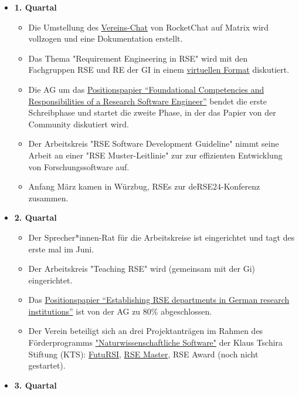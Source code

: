 \begin{itemize}
 \item[] \textbf{1. Quartal}
   \begin{itemize}
     \item Die Umstellung des \href{https://de-rse.org/de/matrix.html}{Vereins-Chat} von RocketChat auf Matrix wird vollzogen und eine Dokumentation erstellt.
     \item Das Thema "Requirement Engineering in RSE" wird mit den Fachgruppen RSE und RE der GI in einem \href{https://fg-re.gi.de/veranstaltung/event-re-and-rse}{virtuellen Format} diskutiert.
     \item Die AG um das \href{https://doi.org/10.12688/f1000research.157778.2}{Positionspapier “Foundational Competencies and Responsibilities of a Research Software Engineer”} bendet die erste Schreibphase und startet die zweite Phase, in der das Papier von der Community diskutiert wird. 
     \item Der Arbeitskreis "RSE Software Development Guideline" nimmt seine Arbeit an einer "RSE Muster-Leitlinie" zur zur effizienten Entwicklung von Forschungssoftware auf.
     \item Anfang März kamen in Würzbug,  RSEs zur deRSE24-Konferenz zusammen.
  
   \end{itemize}\clearpage
 \item[] \textbf{2. Quartal}
   \begin{itemize}
    \item Der Sprecher*innen-Rat für die Arbeitskreise ist eingerichtet und tagt des erste mal im Juni.
    \item Der Arbeitskreis "Teaching RSE" wird (gemeinsam mit der Gi) eingerichtet.
    \item Das \href{https://github.com/DE-RSE/2023_paper-RSE-groups}{Positionspapier “Establishing RSE departments in German research institutions”} ist von der AG zu 80\% abgeschlossen.
    \item Der Verein beteiligt sich an drei Projektanträgen im Rahmen des Förderprogramms \href{https://klaus-tschira-stiftung.de/foerderungen/naturwissenschaftliche-software/}{"Naturwissenschaftliche Software"} der Klaus Tschira Stiftung (KTS): \href{https://www.futursi.de/}{FutuRSI}, \href{https://the-teachingrse-project.github.io/RSE-Masters/}{RSE Master}, RSE Award (noch nicht gestartet).
     
    
   \end{itemize}
 \item[] \textbf{3. Quartal}
   \begin{itemize}


\end{itemize}
\end{itemize}
